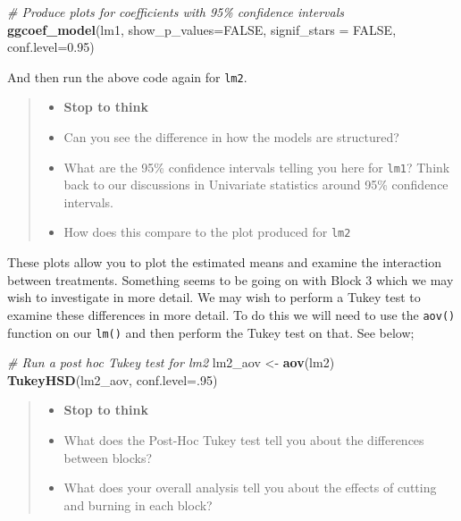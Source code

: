 \documentclass[
]{book}
\newenvironment{Shaded}{\begin{snugshade}}{\end{snugshade}}
\newcommand{\AttributeTok}[1]{\textcolor[rgb]{0.13,0.29,0.53}{#1}}
\newcommand{\CommentTok}[1]{\textcolor[rgb]{0.56,0.35,0.01}{\textit{#1}}}
\newcommand{\ConstantTok}[1]{\textcolor[rgb]{0.56,0.35,0.01}{#1}}
\newcommand{\DecValTok}[1]{\textcolor[rgb]{0.00,0.00,0.81}{#1}}
\newcommand{\FloatTok}[1]{\textcolor[rgb]{0.00,0.00,0.81}{#1}}
\newcommand{\FunctionTok}[1]{\textcolor[rgb]{0.13,0.29,0.53}{\textbf{#1}}}
\newcommand{\NormalTok}[1]{#1}
\newcommand{\OtherTok}[1]{\textcolor[rgb]{0.56,0.35,0.01}{#1}}
\providecommand{\tightlist}{%
  \setlength{\itemsep}{0pt}\setlength{\parskip}{0pt}}
\begin{document}
\begin{Shaded}
\begin{Highlighting}[]
\CommentTok{\# Produce plots for coefficients with 95\% confidence intervals}
\FunctionTok{ggcoef\_model}\NormalTok{(lm1,}
             \AttributeTok{show\_p\_values=}\ConstantTok{FALSE}\NormalTok{,}
             \AttributeTok{signif\_stars =} \ConstantTok{FALSE}\NormalTok{,}
             \AttributeTok{conf.level=}\FloatTok{0.95}\NormalTok{)}
\end{Highlighting}
\end{Shaded}

And then run the above code again for \texttt{lm2}.

\begin{quote}
\begin{itemize}
\tightlist
\item
  \textbf{Stop to think}
\item
  Can you see the difference in how the models are structured?
\item
  What are the 95\% confidence intervals telling you here for \texttt{lm1}? Think back to our discussions in Univariate statistics around 95\% confidence intervals.
\item
  How does this compare to the plot produced for \texttt{lm2}
\end{itemize}
\end{quote}

These plots allow you to plot the estimated means and examine the interaction between treatments. Something seems to be going on with Block 3 which we may wish to investigate in more detail. We may wish to perform a Tukey test to examine these differences in more detail. To do this we will need to use the \texttt{aov()} function on our \texttt{lm()} and then perform the Tukey test on that. See below;

\begin{Shaded}
\begin{Highlighting}[]
\CommentTok{\# Run a post hoc Tukey test for lm2}
\NormalTok{lm2\_aov }\OtherTok{\textless{}{-}} \FunctionTok{aov}\NormalTok{(lm2)}
\FunctionTok{TukeyHSD}\NormalTok{(lm2\_aov, }\AttributeTok{conf.level=}\NormalTok{.}\DecValTok{95}\NormalTok{)}
\end{Highlighting}
\end{Shaded}

\begin{quote}
\begin{itemize}
\tightlist
\item
  \textbf{Stop to think}
\item
  What does the Post-Hoc Tukey test tell you about the differences between blocks?
\item
  What does your overall analysis tell you about the effects of cutting and burning in each block?
\end{itemize}
\end{quote}
\end{document}
